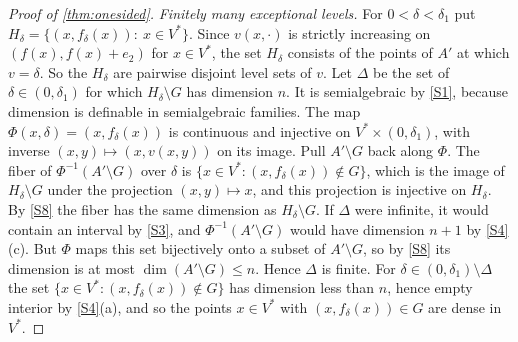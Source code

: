 \begin{proof}[Proof of \cref{thm:onesided}]
\emph{Finitely many exceptional levels.} For $0<\delta<\delta_1$ put $H_\delta=\{(x,f_\delta(x)):\ x\in V^*\}$. Since $v(x,\cdot)$ is strictly increasing on $(f(x),f(x)+e_2)$ for $x\in V^*$, the set $H_\delta$ consists of the points of $A'$ at which $v=\delta$. So the $H_\delta$ are pairwise disjoint level sets of $v$. Let $\Delta$ be the set of $\delta\in(0,\delta_1)$ for which $H_\delta\setminus G$ has dimension $n$. It is semialgebraic by \ref{S1}, because dimension is definable in semialgebraic families. The map $\Phi(x,\delta)=(x,f_\delta(x))$ is continuous and injective on $V^*\times(0,\delta_1)$, with inverse $(x,y)\mapsto(x,v(x,y))$ on its image. Pull $A'\setminus G$ back along $\Phi$. The fiber of $\Phi^{-1}(A'\setminus G)$ over $\delta$ is $\{x\in V^*:(x,f_\delta(x))\notin G\}$, which is the image of $H_\delta\setminus G$ under the projection $(x,y)\mapsto x$, and this projection is injective on $H_\delta$. By \ref{S8} the fiber has the same dimension as $H_\delta\setminus G$. If $\Delta$ were infinite, it would contain an interval by \ref{S3}, and $\Phi^{-1}(A'\setminus G)$ would have dimension $n+1$ by \ref{S4}(c). But $\Phi$ maps this set bijectively onto a subset of $A'\setminus G$, so by \ref{S8} its dimension is at most $\dim(A'\setminus G)\le n$. Hence $\Delta$ is finite. For $\delta\in(0,\delta_1)\setminus\Delta$ the set $\{x\in V^*:(x,f_\delta(x))\notin G\}$ has dimension less than $n$, hence empty interior by \ref{S4}(a), and so the points $x\in V^*$ with $(x,f_\delta(x))\in G$ are dense in $V^*$.


\end{proof}
